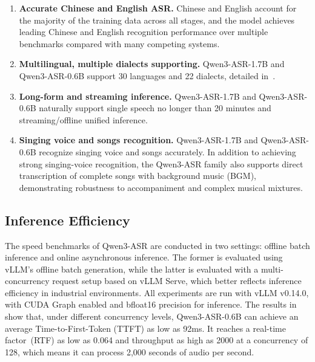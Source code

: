 \begin{enumerate}[label=(\arabic*)]
    \item \textbf{Accurate Chinese and English ASR.} Chinese and English account for the majority of the training data across all stages, and the model achieves leading Chinese and English recognition performance over multiple benchmarks compared with many competing systems.
    \item \textbf{Multilingual, multiple dialects supporting.} Qwen3-ASR-1.7B and Qwen3-ASR-0.6B support 30 languages and 22 dialects, detailed in~.
    \item \textbf{Long-form and streaming inference.} Qwen3-ASR-1.7B and Qwen3-ASR-0.6B naturally support single speech no longer than 20 minutes and streaming/offline unified inference.
    \item \textbf{Singing voice and songs recognition.} Qwen3-ASR-1.7B and Qwen3-ASR-0.6B recognize singing voice and songs accurately. In addition to achieving strong singing-voice recognition, the Qwen3-ASR family also supports direct transcription of complete songs with background music (BGM), demonstrating robustness to accompaniment and complex musical mixtures.
\end{enumerate}

\subsection{Inference Efficiency}

The speed benchmarks of Qwen3-ASR are conducted in two settings: offline batch inference and online asynchronous inference. The former is evaluated using vLLM’s offline batch generation, while the latter is evaluated with a multi-concurrency request setup based on vLLM Serve, which better reflects inference efficiency in industrial environments. All experiments are run with vLLM v0.14.0, with CUDA Graph enabled and bfloat16 precision for inference. The results in~ show that, under different concurrency levels, Qwen3-ASR-0.6B can achieve an average Time-to-First-Token (TTFT) as low as 92ms. It reaches a real-time factor~(RTF) as low as 0.064 and throughput as high as 2000 at a concurrency of 128, which means it can process 2,000 seconds of audio per second. 


